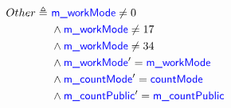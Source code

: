 \documentclass[fleqn,a4paper]{article}
\newcommand\Var[1]{\textcolor{blue}{\textsf{#1}}}
\newcommand\definedby{\triangleq}
\begin{document}
\begin{description}
\begin{align*}
Other \definedby \
& \Var{m\_workMode} \neq 0 \\
& \wedge \Var{m\_workMode} \neq 17 \\
& \wedge \Var{m\_workMode} \neq 34 \\
& \wedge \Var{m\_workMode}' = \Var{m\_workMode} \\
& \wedge \Var{m\_countMode}' = \Var{countMode} \\
& \wedge \Var{m\_countPublic}' = \Var{m\_countPublic}
\end{align*}

\end{description}
\end{document}
